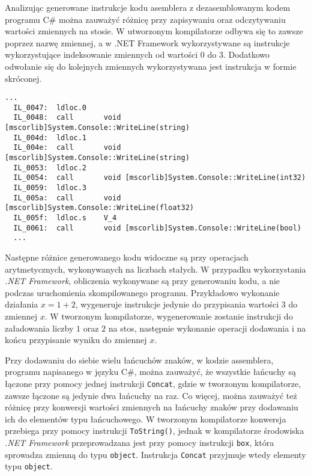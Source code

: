 \par Analizując generowane instrukcje kodu asemblera z dezasemblowanym kodem programu C\# można zauważyć różnicę przy zapisywaniu oraz odczytywaniu wartości zmiennych na stosie. W utworzonym kompilatorze odbywa się to zawsze poprzez nazwę zmiennej, a w .NET Framework wykorzystywane są instrukcje wykorzystujące indeksowanie zmiennych od wartości 0 do 3. Dodatkowo odwołanie się do kolejnych zmiennych wykorzystywana jest instrukcja w formie skróconej.


\begin{lstlisting}[language=IL, caption={Fragment kodu deasemblerowanego testu programu C\#, przedstawiający ładowanie wartości zmiennych na stos}, label=alg:asm]
  ...
  IL_0047:  ldloc.0
  IL_0048:  call       void [mscorlib]System.Console::WriteLine(string)
  IL_004d:  ldloc.1
  IL_004e:  call       void [mscorlib]System.Console::WriteLine(string)
  IL_0053:  ldloc.2
  IL_0054:  call       void [mscorlib]System.Console::WriteLine(int32)
  IL_0059:  ldloc.3
  IL_005a:  call       void [mscorlib]System.Console::WriteLine(float32)
  IL_005f:  ldloc.s    V_4
  IL_0061:  call       void [mscorlib]System.Console::WriteLine(bool)
  ...
\end{lstlisting}

\par Następne różnice generowanego kodu widoczne są przy operacjach arytmetycznych, wykonywanych na liczbach stałych. W przypadku wykorzystania \textit{.NET Framework}, obliczenia wykonywane są przy generowaniu kodu, a nie podczas uruchomienia skompilowanego programu. Przykładowo wykonanie działania $x = 1 + 2$, wygeneruje instrukcje jedynie do przypisania wartości $3$ do zmiennej $x$. W tworzonym kompilatorze, wygenerowanie zostanie instrukcji do załadowania liczby $1$ oraz $2$ na stos, następnie wykonanie operacji dodawania i na końcu przypisanie wyniku do zmiennej $x$.
\par Przy dodawaniu do siebie wielu łańcuchów znaków, w kodzie assemblera, programu napisanego w języku C\#, można zauważyć, że wszystkie łańcuchy są łączone przy pomocy jednej instrukcji \texttt{Concat}, gdzie w tworzonym kompilatorze, zawsze łączone są jedynie dwa łańcuchy na raz. Co więcej, można zauważyć też różnicę przy konwersji wartości zmiennych na łańcuchy znaków przy dodawaniu ich do elementów typu łańcuchowego. W tworzonym kompilatorze konwersja przebiega przy pomocy instrukcji \texttt{ToString()}, jednak w kompilatorze środowiska \textit{.NET Framework} przeprowadzana jest przy pomocy instrukcji \texttt{box}, która sprowadza zmienną do typu \texttt{object}. Instrukcja \texttt{Concat} przyjmuje wtedy elementy typu \texttt{object}.


